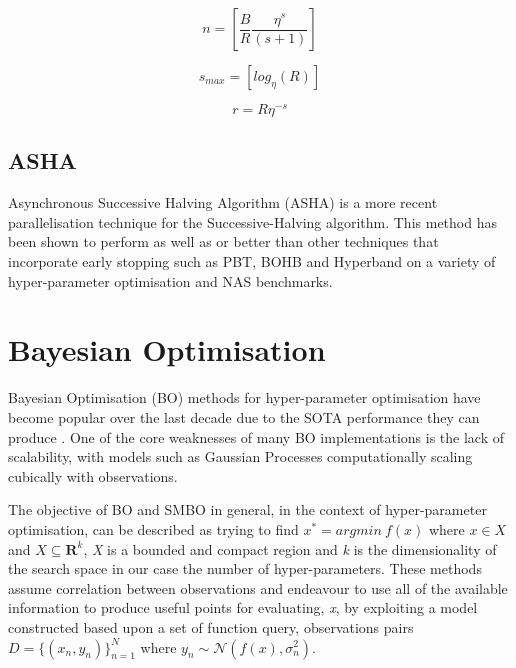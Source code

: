 \documentclass{article}
\begin{document}
		\begin{equation}
			n = \left[ \frac{B}{R}\frac{\eta^s}{(s+1)} \right]
		\end{equation}

		\begin{equation}
			s_{max} = \left[ log_\eta(R) \right]
		\end{equation}

		\begin{equation}
			r = R\eta^{-s}
		\end{equation}

	\subsection{ASHA}

		Asynchronous Successive Halving Algorithm (ASHA) \cite{34} is a more recent parallelisation technique for the Successive-Halving algorithm. This method has been shown to perform as well as or better than other techniques that incorporate early stopping such as PBT, BOHB and Hyperband on a variety of hyper-parameter optimisation and NAS benchmarks.




\section {Bayesian Optimisation}

	Bayesian Optimisation (BO) methods for hyper-parameter optimisation have become popular over the last decade due to the SOTA performance they can produce \cite{32} \cite{20}. One of the core weaknesses of many BO implementations is the lack of scalability, with models such as Gaussian Processes computationally scaling cubically with observations.
	\par

	The objective of BO and SMBO in general, in the context of hyper-parameter optimisation, can be described as trying to find \(x^* = argmin~ f(x)\) where \(x \in X\) and \(X \subseteq \mathbf{R} ^k\), \textit{X} is a bounded and compact region and \textit{k} is the dimensionality of the search space in our case the number of hyper-parameters. These methods assume correlation between observations and endeavour to use all of the available information to produce useful points for evaluating, \textit{x}, by exploiting a model constructed based upon a set of function query, observations pairs \( D = \{(x_n,y_n)\}_{n=1}^N\) where \(y_n \sim \mathcal{N}(f(x), \sigma_n^2) \).
\end{document}
